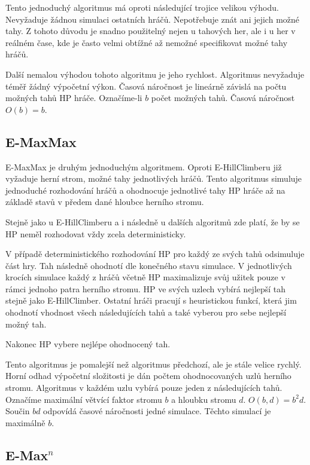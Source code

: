 Tento jednoduchý algoritmus má oproti následující trojice velikou výhodu. Nevyžaduje žádnou simulaci ostatních hráčů. Nepotřebuje znát ani jejich možné tahy. Z tohoto důvodu je snadno použitelný nejen u tahových her, ale i u her v reálném čase, kde je často velmi obtížné až nemožné specifikovat možné tahy hráčů.

Další nemalou výhodou tohoto algoritmu je jeho rychlost. Algoritmus nevyžaduje téměř žádný výpočetní výkon. Časová náročnost je lineárně závislá na počtu možných tahů HP hráče. Označíme-li $b$ počet možných tahů. Časová náročnost $O(b) = b$.

\subsection{E-MaxMax}

E-MaxMax je druhým jednoduchým algoritmem. Oproti E-HillClimberu již vyžaduje herní strom, možné tahy jednotlivých hráčů. Tento algoritmus simuluje jednoduché rozhodování hráčů a ohodnocuje jednotlivé tahy HP hráče až na základě stavů v předem dané hloubce herního stromu.

Stejně jako u E-HillClimberu a i následně u dalších algoritmů zde platí, že by se HP neměl rozhodovat vždy zcela deterministicky.

V případě deterministického rozhodování HP pro každý ze svých tahů odsimuluje část hry. Tah následně ohodnotí dle konečného stavu simulace. V jednotlivých krocích simulace každý z hráčů včetně HP maximalizuje svůj užitek pouze v rámci jednoho patra herního stromu. HP ve svých uzlech vybírá nejlepší tah stejně jako E-HillClimber. Ostatní hráči pracují s heuristickou funkcí, která jim ohodnotí vhodnost všech následujících tahů a také vyberou pro sebe nejlepší možný tah.

Nakonec HP vybere nejlépe ohodnocený tah.

Tento algoritmus je pomalejší než algoritmus předchozí, ale je stále velice rychlý. Horní odhad výpočetní složitosti je dán počtem ohodnocovaných uzlů herního stromu. Algoritmus v každém uzlu vybírá pouze jeden z následujících tahů. Označíme maximální větvící faktor stromu $b$ a hloubku stromu $d$. $O(b, d) = b^2d$. Součin $bd$ odpovídá časové náročnosti jedné simulace. Těchto simulací je maximálně $b$.

\subsection{E-Max$^n$}
 
